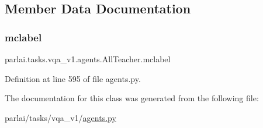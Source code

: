 \subsection{Member Data Documentation}
\mbox{\label{classparlai_1_1tasks_1_1vqa__v1_1_1agents_1_1AllTeacher_a195e6128ad37b6d0428866745c0490e3}} 
\subsubsection{\texorpdfstring{mclabel}{mclabel}}
{\footnotesize\ttfamily parlai.\+tasks.\+vqa\+\_\+v1.\+agents.\+All\+Teacher.\+mclabel}



Definition at line 595 of file agents.\+py.



The documentation for this class was generated from the following file\+:\begin{DoxyCompactItemize}
\item 
parlai/tasks/vqa\+\_\+v1/\hyperlink{parlai_2tasks_2vqa__v1_2agents_8py}{agents.\+py}\end{DoxyCompactItemize}
